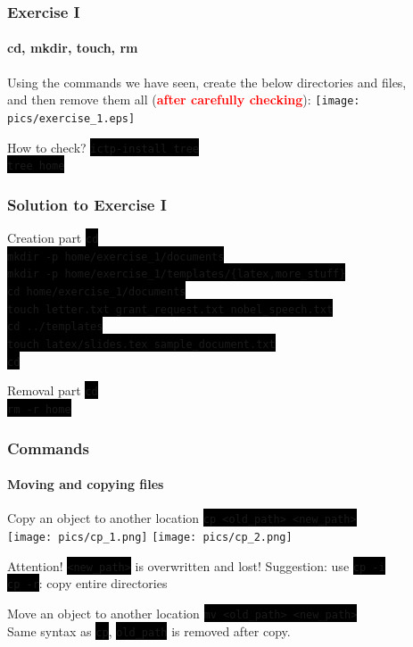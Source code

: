 \documentclass[unknownkeysallowed, 10pt, a4 paper, handout]{beamer}
\newcommand{\focus}[1]{\textbf{\textcolor{red}{#1}}}
\newcommand{\code}[1]{\colorbox{black}{\color{green}\texttt{#1}}}
\begin{document}
\begin{frame}[c]
  \frametitle{Exercise I}
  \framesubtitle{cd, mkdir, touch, rm}
  \begin{block}{}
    Using the commands we have seen, create the below directories and files,\\
    and then remove them all (\focus{after carefully checking}):
    \texttt{[image: pics/exercise\_1.eps]}
  \end{block}
  \begin{alertblock}{How to check?}
    \code{ictp-install tree}\\
    \code{tree home}
  \end{alertblock}
\end{frame}


\begin{frame}[c]
  \frametitle{Solution to Exercise I}
  \begin{block}{Creation part}
  \small{
  \code{cd} \\
  \code{mkdir -p home/exercise\_1/documents} \\
  \code{mkdir -p home/exercise\_1/templates/\{latex,more\_stuff\}} \\
  \code{cd home/exercise\_1/documents} \\
  \code{touch letter.txt grant\_request.txt nobel\_speech.txt} \\
  \code{cd ../templates} \\
  \code{touch latex/slides.tex sample\_document.txt} \\
  \code{cd}
  }
  \end{block}
  \begin{block}{Removal part}
  \small{
  \code{cd} \\
  \code{rm -r home}
  }
  \end{block}
\end{frame}


\begin{frame}
  \frametitle{Commands}
  \framesubtitle{Moving and copying files}

  \begin{exampleblock}{Copy an object to another location}
  \code{cp <old\_path> <new\_path>} \\
  \texttt{[image: pics/cp\_1.png]}
  \texttt{[image: pics/cp\_2.png]}
  \end{exampleblock}

  \begin{alertblock}{Attention! \code{<new\_path>} is overwritten and lost!}
  Suggestion: use \code{cp -i}\\
  \code{cp -r}: copy entire directories
  \end{alertblock}

  \begin{exampleblock}{Move an object to another location}
  \code{mv <old\_path> <new\_path>}\\
  Same syntax as \code{cp}, \code{old\_path} is removed after copy.
  \end{exampleblock}
\end{frame}
\end{document}
